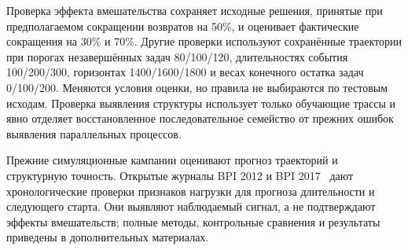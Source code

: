 Проверка эффекта вмешательства сохраняет исходные решения, принятые при предполагаемом сокращении возвратов на 50\%, и оценивает фактические сокращения на 30\% и 70\%. Другие проверки используют сохранённые траектории при порогах незавершённых задач 80/100/120, длительностях события 100/200/300, горизонтах 1400/1600/1800 и весах конечного остатка задач 0/100/200. Меняются условия оценки, но правила не выбираются по тестовым исходам. Проверка выявления структуры использует только обучающие трассы и явно отделяет восстановленное последовательное семейство от прежних ошибок выявления параллельных процессов.

Прежние симуляционные кампании оценивают прогноз траекторий и структурную точность. Открытые журналы BPI 2012 и BPI 2017~\cite{bpi12,bpi17} дают хронологические проверки признаков нагрузки для прогноза длительности и следующего старта. Они выявляют наблюдаемый сигнал, а не подтверждают эффекты вмешательств; полные методы, контрольные сравнения и результаты приведены в дополнительных материалах.
